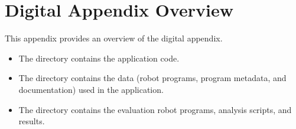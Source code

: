 \chapter{Digital Appendix Overview} \label{appendix:digital-appendix-overview}
This appendix provides an overview of the digital appendix.

\begin{itemize}
    \item The  directory contains the application code.
    \item The  directory contains the data (robot programs, program metadata, and documentation) used in the application.
    \item The  directory contains the evaluation robot programs, analysis scripts, and results.
\end{itemize}
